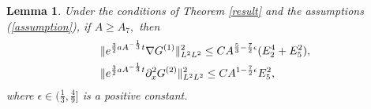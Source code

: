 \documentclass[12pt, reqno]{amsart}
\newtheorem{lemma}{Lemma}[section]
\numberwithin{equation}{section}
\begin{document}
	\begin{lemma}\label{result_51}
		Under the conditions of Theorem \ref{result} and the assumptions (\ref{assumption}),
		if $A\geq A_7,$ then
		\begin{equation}\label{eq:g1g2}
			\begin{aligned}
				&\|{\rm e}^{\frac32aA^{-\frac{1}{3}}t}
				\nabla G^{(1)}\|^2_{L^2L^2}
				\leq CA^{\frac53-\frac72\epsilon}(E_2^4+E_5^2),\\
				&\|{\rm e}^{\frac32aA^{-\frac{1}{3}}t}
				\partial_x^2 G^{(2)}\|^2_{L^2L^2}
				\leq CA^{1-\frac{7}{2}\epsilon}E_5^2,
			\end{aligned}		
		\end{equation}
		where $ \epsilon\in(\frac13, \frac49] $ is a positive constant.
		
	\end{lemma}
\end{document}
